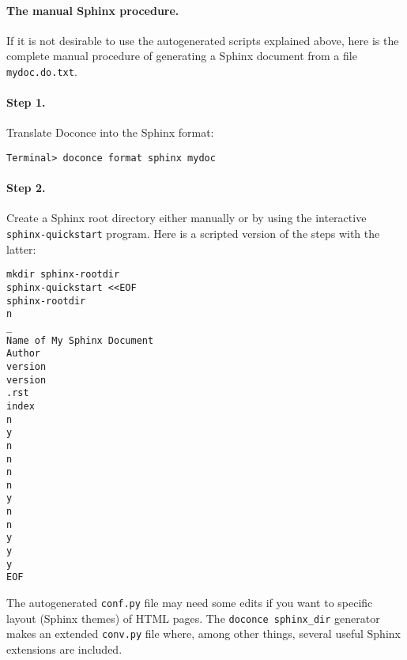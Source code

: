 \documentclass[%
oneside,                 %
final,                   %
10pt]{article}
\begin{document}
\paragraph{The manual Sphinx procedure.}
If it is not desirable to use the autogenerated scripts explained
above, here is the complete manual procedure of generating a
Sphinx document from a file {\fontsize{10pt}{10pt}\Verb!mydoc.do.txt!}.

\paragraph{Step 1.}
Translate Doconce into the Sphinx format:
\vspace{4pt}
\begin{Verbatim}[numbers=none,frame=lines,label=\fbox{{\tiny Terminal}},fontsize=\fontsize{9pt}{9pt},
labelposition=topline,framesep=2.5mm,framerule=0.7pt]
Terminal> doconce format sphinx mydoc
\end{Verbatim}

\paragraph{Step 2.}
Create a Sphinx root directory
either manually or by using the interactive {\fontsize{10pt}{10pt}\Verb!sphinx-quickstart!}
program. Here is a scripted version of the steps with the latter:
\vspace{4pt}
\begin{Verbatim}[numbers=none,frame=lines,label=\fbox{{\tiny Terminal}},fontsize=\fontsize{9pt}{9pt},
labelposition=topline,framesep=2.5mm,framerule=0.7pt]
mkdir sphinx-rootdir
sphinx-quickstart <<EOF
sphinx-rootdir
n
_
Name of My Sphinx Document
Author
version
version
.rst
index
n
y
n
n
n
n
y
n
n
y
y
y
EOF
\end{Verbatim}
The autogenerated {\fontsize{10pt}{10pt}\Verb!conf.py!} file
may need some edits if you want to specific layout (Sphinx themes)
of HTML pages. The {\fontsize{10pt}{10pt}\Verb!doconce sphinx_dir!} generator makes an extended {\fontsize{10pt}{10pt}\Verb!conv.py!}
file where, among other things, several useful Sphinx extensions
are included.
\end{document}
